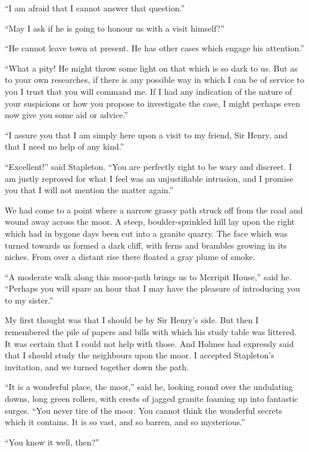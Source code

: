 \documentclass[paper=a5,BCOR=7mm,twoside,DIV=calc,12pt,usegeometry,openany,chapterprefix,endperiod,headings=big]{scrbook} %
\begin{document}
\enquote{I am afraid that I cannot answer that question.}

\enquote{May I ask if he is going to honour us with a visit himself?}

\enquote{He cannot leave town at present. He has other cases which engage his attention.}

\enquote{What a pity! He might throw some light on that which is so dark to us. But as to your own researches, if there is any possible way in which I can be of service to you I trust that you will command me. If I had any indication of the nature of your suspicions or how you propose to investigate the case, I might perhaps even now give you some aid or advice.}

\enquote{I assure you that I am simply here upon a visit to my friend, Sir Henry, and that I need no help of any kind.}

\enquote{Excellent!} said Stapleton. \enquote{You are perfectly right to be wary and discreet. I am justly reproved for what I feel was an unjustifiable intrusion, and I promise you that I will not mention the matter again.}

We had come to a point where a narrow grassy path struck off from the road and wound away across the moor. A steep, boulder-sprinkled hill lay upon the right which had in bygone days been cut into a granite quarry. The face which was turned towards us formed a dark cliff, with ferns and brambles growing in its niches. From over a distant rise there floated a gray plume of smoke.

\enquote{A moderate walk along this moor-path brings us to Merripit House,} said he. \enquote{Perhaps you will spare an hour that I may have the pleasure of introducing you to my sister.}

My first thought was that I should be by Sir Henry's side. But then I remembered the pile of papers and bills with which his study table was littered. It was certain that I could not help with those. And Holmes had expressly said that I should study the neighbours upon the moor. I accepted Stapleton's invitation, and we turned together down the path.

\enquote{It is a wonderful place, the moor,} said he, looking round over the undulating downs, long green rollers, with crests of jagged granite foaming up into fantastic surges. \enquote{You never tire of the moor. You cannot think the wonderful secrets which it contains. It is so vast, and so barren, and so mysterious.}

\enquote{You know it well, then?}
\end{document}
